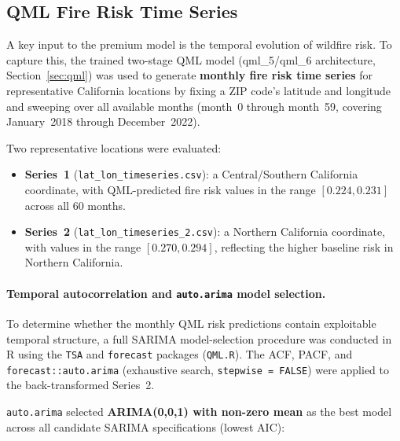 \documentclass[11pt,a4paper]{article}
\begin{document}
\subsection{QML Fire Risk Time Series}
\label{sec:timeseries}

A key input to the premium model is the temporal evolution of wildfire risk.
To capture this, the trained two-stage QML model (qml\_5/qml\_6 architecture,
Section~\ref{sec:qml}) was used to generate \textbf{monthly fire risk time
series} for representative California locations by fixing a ZIP code's
latitude and longitude and sweeping over all available months (month~0 through
month~59, covering January~2018 through December~2022).

Two representative locations were evaluated:
\begin{itemize}[leftmargin=*]
    \item \textbf{Series~1} (\texttt{lat\_lon\_timeseries.csv}): a Central/Southern
          California coordinate, with QML-predicted fire risk values in the range
          $[0.224, 0.231]$ across all 60 months.
    \item \textbf{Series~2} (\texttt{lat\_lon\_timeseries\_2.csv}): a Northern
          California coordinate, with values in the range $[0.270, 0.294]$,
          reflecting the higher baseline risk in Northern California.
\end{itemize}

\paragraph{Temporal autocorrelation and \texttt{auto.arima} model selection.}
To determine whether the monthly QML risk predictions contain exploitable
temporal structure, a full SARIMA model-selection procedure was conducted in R
using the \texttt{TSA} and \texttt{forecast} packages (\texttt{QML.R}).
The ACF, PACF, and \texttt{forecast::auto.arima} (exhaustive search,
\texttt{stepwise = FALSE}) were applied to the back-transformed Series~2.

\texttt{auto.arima} selected \textbf{ARIMA(0,0,1) with non-zero mean} as
the best model across all candidate SARIMA specifications (lowest AIC):
\end{document}
